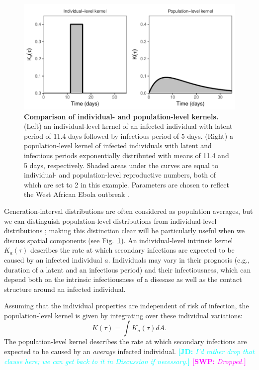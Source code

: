 \documentclass[12pt]{article}
\newcommand{\fref}[1]{Fig.~\ref{fig:#1}}
\newcommand{\comment}[3]{\textcolor{#1}{\textbf{[#2: }\textsl{#3}\textbf{]}}}
\newcommand{\jd}[1]{\comment{cyan}{JD}{#1}}
\newcommand{\swp}[1]{\comment{magenta}{SWP}{#1}}
\begin{document}
\begin{figure}[!pbth]
\includegraphics[width=\textwidth]{../fig/individual_and_population.pdf}
\caption{\textbf{Comparison of individual- and population-level kernels.}
(Left) an individual-level kernel of an infected individual with latent period of 11.4 days followed by infectious period of 5 days. 
(Right) a population-level kernel of infected individuals with latent and infectious periods exponentially distributed with means of 11.4 and 5 days, respectively. 
Shaded areas under the curves are equal to individual- and population-level reproductive numbers, both of which are set to 2 in this example.
Parameters are chosen to reflect the West African Ebola outbreak \citep{who2014ebola}.
}
\label{fig:indpop}

\end{figure}

Generation-interval distributions are often considered as population averages, but we can distinguish population-level distributions from individual-level distributions \citep{svensson2007note, svensson2015influence}; 
making this distinction clear will be particularly useful when we discuss spatial components (see \fref{indpop}).
An individual-level intrinsic kernel $K_a(\tau)$ describes the rate at which secondary infections are expected to be caused by an infected individual $a$.
Individuals may vary in their prognosis (e.g., duration of a latent and an infectious period) and their infectiousness, which can depend both on the intrinsic infectiousness of a disesase as well as the contact structure around an infected individual.

Assuming that the individual properties are independent of risk of infection, the population-level kernel is given by integrating over these individual variations:
\begin{equation}
K(\tau) = \int K_a (\tau) dA.
\end{equation}
The population-level kernel describes the rate at which secondary infections are expected to be caused by an \emph{average} infected individual.
\jd{I'd rather drop that clause here; we can get back to it in Discussion if necessary.}
\swp{Dropped.}
\end{document}
